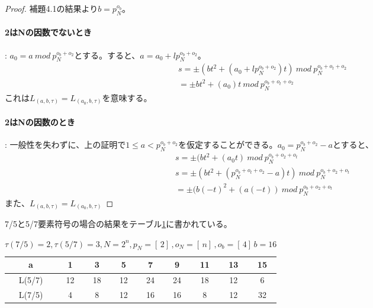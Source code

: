 \documentclass[24 pts]{article}
\begin{document}
\begin{proof}
補題4.1の結果より$b=p_N^{o_{b}}$。
\paragraph{2はNの因数でないとき}:
$a_0=a\ mod \ p_N^{o_{b}+o_{2}}$とする。すると、$a=a_0+lp_N^{o_{b}+o_{2}}$。
\begin{equation}\tag{11}
\begin{split}
&s=\pm ({b}t^2 + (a_0+lp_N^{o_{b}+o_{2}})t)\ mod \ p_N^{o_b+o_t+o_2}\\
&=\pm {b}t^2 + (a_0)t\ mod \ p_N^{o_b+o_t+o_2}
\end{split}
\end{equation}
これは$L_(a,b,\tau)=L_(a_0,b,\tau)$を意味する。
\paragraph{2はNの因数のとき}:
一般性を失わずに、上の証明で$1 \leq a < p_N^{o_b+o_2}$を仮定することができる。$a_0=p_N^{o_b+o_2}-a$とすると、
\begin{equation}\tag{12}
\begin{split}
&s=\pm ({b}t^2 + (a_0t)\ mod \ p_N^{o_b+o_2+o_t}\\
&s=\pm ({b}t^2 + (p_N^{o_b+o_t+o_2}-a)t)\ mod \ p_N^{o_b+o_2+o_t}\\
&=\pm (b(-t)^2 +(a(-t))\ mod \ p_N^{o_b+o_2+o_t}
\end{split}
\end{equation}
また、$L_(a,b,\tau)=L_(a_0,b,\tau)$
\end{proof}
7/5と5/7要素符号の場合の結果をテーブル\ref{テーブル:１}に書かれている。
\begin{table}[h!]
\begin{center}
\begin{tabular}{|c|c|c|c|c|c|c|c|c|}
\hline
a & 1 & 3 & 5 & 7 & 9 & 11 & 13 & 15 \\
\hline
L(5/7) & 12 & 18 & 12 & 24 & 24 & 18 & 12 & 6 \\
\hline
L(7/5) & 4 & 8 & 12 & 16 & 16 & 8 & 12 & 32 \\
\hline
\end{tabular}
\caption{$\tau(7/5) =2,\tau(5/7) =3,N=2^n,p_N=[\, 2]\,,o_N=[\, n]\,,o_b=[\, 4]\,b=16$}
\label{テーブル:１}
\end{center}
\end{table}
\paragraph{}
\end{document}
